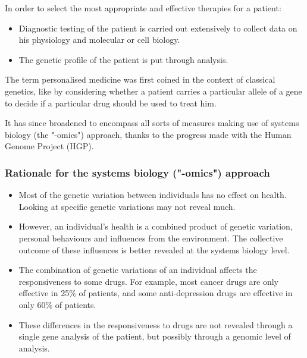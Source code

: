 \documentclass[11pt]{article}
\begin{document}
In order to select the most appropriate and effective therapies for a patient:
\begin{itemize}
\item Diagnostic testing of the patient is carried out extensively to collect data on his physiology and molecular or cell biology.
\item The genetic profile of the patient is put through analysis.
\end{itemize}

The term personalised medicine was first coined in the context of classical genetics, like by considering whether a patient carries a particular allele of a gene to decide if a particular drug should be used to treat him.

It has since broadened to encompass all sorts of measures making use of systems biology (the "-omics") approach, thanks to the progress made with the Human Genome Project (HGP).

\newpage

\subsubsection{Rationale for the systems biology ("-omics") approach}
\label{sec:org2dd6708}
\begin{itemize}
\item Most of the genetic variation between individuals has no effect on health. Looking at specific genetic variations may not reveal much.
\item However, an individual's health is a combined product of genetic variation, personal behaviours and influences from the environment. The collective outcome of these influences is better revealed at the systems biology level.
\item The combination of genetic variations of an individual affects the responsiveness to some drugs. For example, most cancer drugs are only effective in 25\% of patients, and some anti-depression drugs are effective in only 60\% of patients.
\item These differences in the responsiveness to drugs are not revealed through a single gene analysis of the patient, but possibly through a genomic level of analysis.
\end{itemize}
\end{document}
